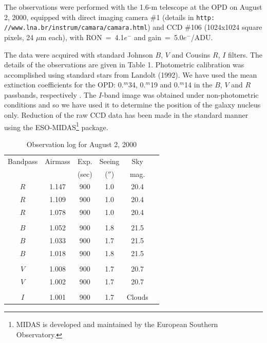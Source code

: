 \documentclass{aa}
\begin{document}
The observations were performed with the 1.6-m telescope at the OPD on
August 2, 2000,  equipped with direct  imaging  camera \#1 (details in
{\tt  http:  //www.lna.br/instrum/camara/camara.html})  and CCD  \#106
(1024x1024 square pixels, 24 $\mu$m each), with  RON~=~4.1$e^{-}$  and
gain~=~5.0$e^{-}$/ADU.

The data were acquired with standard Johnson $B$, $V$ and Cousins $R$,
$I$  filters.  The  details  of  the  observations  are given in  Table  1.
Photometric  calibration  was  accomplished  using standard stars from
Landolt (1992).  We have used the mean extinction coefficients for the
OPD:  0.$^m$34,  0.$^m$19  and  0.$^m$14  in  the  $B$,  $V$  and  $R$  
passbands,
respectively .  The $I$-band image was obtained under  non-photometric
conditions  and so we have used it to  determine  the  position of the
galaxy  nucleus  only.  Reduction of the raw CCD data has been made in
the standard  manner using the  ESO-MIDAS\footnote{MIDAS  is developed
and maintained by the European Southern Observatory.}  package.

\begin{table}
\caption{Observation log for August 2, 2000}
\begin{center}
\begin{tabular}{cccccc}
\hline
Bandpass & Airmass  & Exp. & Seeing & Sky \\
         &          &(sec) &  ($''$)& mag. \\
\hline
$R$      & 1.147    & 900 &   1.0   &  20.4 \\
$R$      & 1.109    & 900 &   1.0   &  20.4  \\
$R$      & 1.078    & 900 &   1.0   &  20.4  \\
       &  &  &  &  \\
$B$      & 1.052    & 900 &   1.8   &  21.5 \\
$B$      & 1.033    & 900 &   1.7   &  21.5   \\
$B$      & 1.018    & 900 &   1.8   &  21.5  \\
&  &  &  &  \\
$V$      & 1.008    & 900 &   1.7   &  20.7 \\
$V$      & 1.002    & 900 &   1.7   &  20.7  \\
&  &  &  &  \\
$I$      & 1.001    & 900 &   1.7   & Clouds \\
\hline
\end{tabular}
\end{center}
\end{table}
\end{document}
